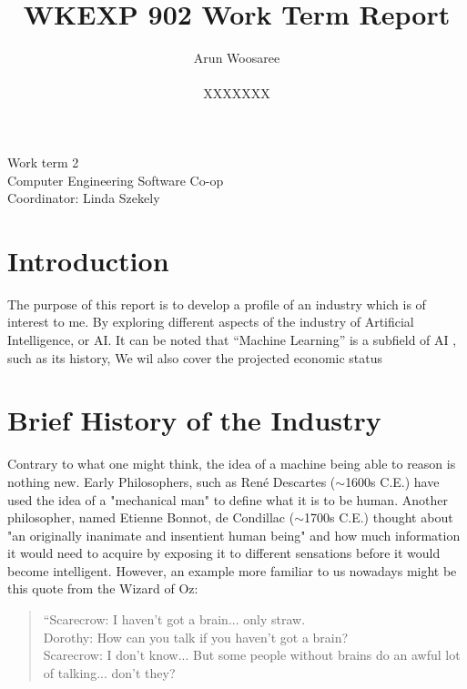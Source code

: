\documentclass[letterpaper,12pt]{article}
\title{WKEXP 902 Work Term Report}
\author{Arun Woosaree \\ \\ XXXXXXX}
\begin{document}
\relax
\begin{titlepage}
 \maketitle
 \thispagestyle{empty} %
 \centering
 \large
 \vspace{1cm}
 Work term 2\\
 \vspace{1cm}
 Computer Engineering Software Co-op \\
 \vspace{1cm}
 Coordinator: Linda Szekely
\end{titlepage}

\section{Introduction}
The purpose of this report is to develop a profile of an industry which is of interest to me.
By exploring different aspects of the industry of Artificial Intelligence, or AI.
It can be noted that ``Machine Learning'' is a subfield of AI \cite{sasAIvsML} , such as its history, 
We wil also cover the projected economic status 

\section{Brief History of the Industry}
Contrary to what one might think, the idea of a machine being able to reason is nothing new. 
Early Philosophers, such as René Descartes ($\sim$1600s C.E.) have used the idea of a "mechanical man"
to define what it is to be human.\cite{briefhistory}\cite{sep-descartes}
Another philosopher, named Etienne Bonnot, de Condillac\cite{briefhistory} ($\sim$1700s C.E.)
thought about "an originally inanimate and insentient human being"\cite{sep-condillac}
and how much information it would need to acquire by exposing it to different sensations
before it would become intelligent. However, an example more familiar to us nowadays
might be this quote from the Wizard of Oz\cite{wizardofoz}:
\begin{quotation}
    \noindent“Scarecrow: I haven't got a brain... only straw.\\
    Dorothy: How can you talk if you haven't got a brain?\\
    Scarecrow: I don't know... But some people without brains do an awful lot of talking... don't they?\\
\end{quotation}
\end{document}
